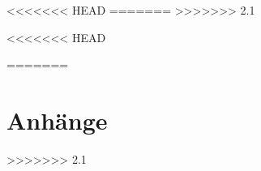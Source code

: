 \documentclass[oneside, headings=small,headsepline,12pt, a4paper, numbers=noenddot, chapterprefix=false,parskip=full-]{scrreprt}
\begin{document}


<<<<<<< HEAD
\setcounter{page}{1}
=======
\clearpage\setcounter{page}{1}
>>>>>>> 2.1

\onehalfspacing



<<<<<<< HEAD



=======


\appendix
{}
\part*{Anhänge}

\setcounter{page}{4}




>>>>>>> 2.1
\end{document}
